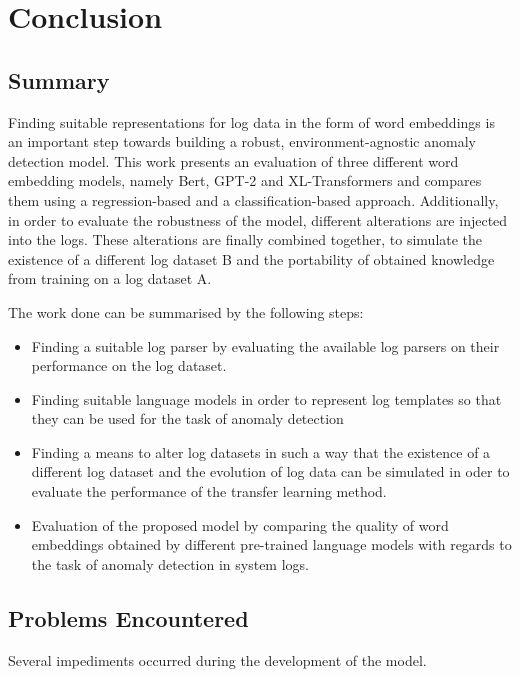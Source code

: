 \chapter{Conclusion\label{cha:conclusion}}



\section{Summary\label{sec:summary}}

Finding suitable representations for log data in the form of word embeddings is an important step towards building a robust, environment-agnostic anomaly detection model. This work presents an evaluation of three different word embedding models, namely Bert, GPT-2 and XL-Transformers and compares them using a regression-based and a classification-based approach. Additionally, in order to evaluate the robustness of the model, different alterations are injected into the logs. These alterations are finally combined together, to simulate the existence of a different log dataset B and the portability of obtained knowledge from training on a log dataset A.

The work done can be summarised by the following steps:
\begin{itemize}
		\item Finding a suitable log parser by evaluating the available log parsers on their performance on the log dataset.
		\item Finding suitable language models in order to represent log templates so that they can be used for the task of anomaly detection
		\item Finding a means to alter log datasets in such a way that the existence of a different log dataset and the evolution of log data can be simulated in oder to evaluate the performance of the transfer learning method.
		\item Evaluation of the proposed model by comparing the quality of word embeddings obtained by different pre-trained language models with regards to the task of anomaly detection in system logs.
\end{itemize}


\section{Problems Encountered\label{sec:problems}}
Several impediments occurred during the development of the model. 

